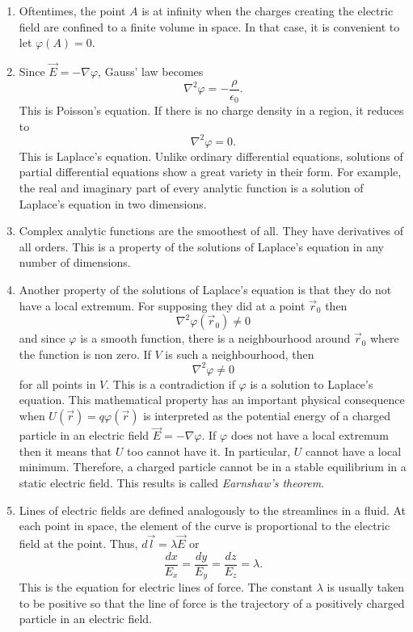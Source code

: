 \documentclass{article}
\newcommand{\grad}[1]{\nabla{#1}}
\begin{document}
\begin{enumerate}
\item Oftentimes, the point $A$ is at infinity when the charges creating the
electric field are confined to a finite volume in space. In that case, it is 
convenient to let $\varphi(A) = 0$.

\item Since $\vec{E} = -\grad\varphi$, Gauss' law becomes
\begin{equation}\label{e5}
\nabla^2\varphi = -\frac{\rho}{\epsilon_0}.
\end{equation}
This is Poisson's equation. If there is no charge density in a region, it reduces 
to
\begin{equation}\label{e6}
\nabla^2\varphi = 0.
\end{equation}
This is Laplace's equation. Unlike ordinary differential equations, solutions of
partial differential equations show a great variety in their form. For example,
the real and imaginary part of every analytic function is a solution of Laplace's
equation in two dimensions.

\item Complex analytic functions are the smoothest of all. They have derivatives of
all orders. This is a property of the solutions of Laplace's equation in any number
of dimensions.

\item Another property of the solutions of Laplace's equation is that they do not
have a local extremum. For supposing they did at a point $\vec{r}_0$ then 
\[
\nabla^2\varphi(\vec{r}_0) \ne 0
\]
and since $\varphi$ is a smooth function, there is a neighbourhood around 
$\vec{r}_0$ where the function is non zero. If $V$ is such a neighbourhood, then
\[
\nabla^2\varphi \ne 0
\]
for all points in $V$. This is a contradiction if $\varphi$ is a solution to
Laplace's equation. This mathematical property has an important physical
consequence when $U(\vec{r}) = q\varphi(\vec{r})$ is interpreted as the potential
energy of a charged particle in an electric field $\vec{E} = -\grad{\varphi}$. 
If $\varphi$ does not have a local extremum then it means that $U$ too cannot 
have it. In particular, $U$ cannot have a local minimum. Therefore, a charged
particle cannot be in a stable equilibrium in a static electric field. This
results is called \emph{Earnshaw's theorem}.

\item Lines of electric fields are defined analogously to the streamlines in a
fluid. At each point in space, the element of the curve is proportional to the
electric field at the point. Thus, $d\vec{l} = \lambda\vec{E}$ or
\begin{equation}\label{e7}
\frac{dx}{E_x} = \frac{dy}{E_y} = \frac{dz}{E_z} = \lambda.
\end{equation}
This is the equation for electric lines of force. The constant $\lambda$ is
usually taken to be positive so that the line of force is the trajectory of
a positively charged particle in an electric field.

\end{enumerate}
\end{document}
